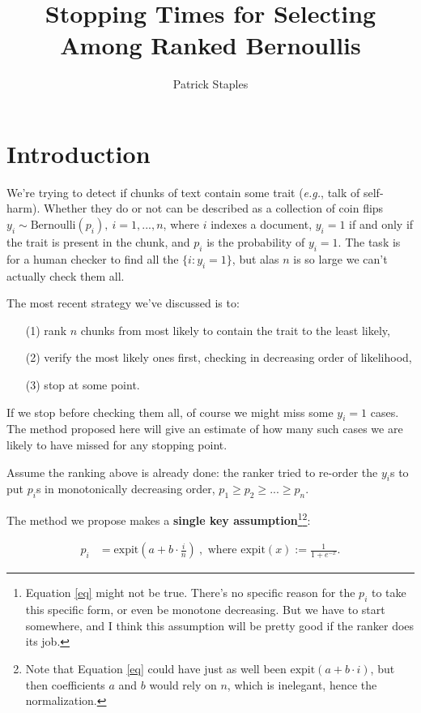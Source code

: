 \documentclass{article}
\title{Stopping Times for Selecting\\Among Ranked Bernoullis}
\date{}
\author{Patrick Staples}
\begin{document}
\maketitle

\section{Introduction}

We're trying to detect if chunks of text contain some trait (\textit{e.g.}, talk of self-harm). Whether they do or not can be described as a collection of coin flips $y_i \sim \text{Bernoulli}(p_i),\ i=1,...,n$, where $i$ indexes a document, $y_i=1$ if and only if the trait is present in the chunk, and $p_i$ is the probability of $y_i=1$. The task is for a human checker to find all the $\{i: y_i=1\}$, but alas $n$ is so large we can't actually check them all.

The most recent strategy we've discussed is to:
\begin{enumerate}
\item[(1)] rank $n$ chunks from most likely to contain the trait to the least likely,
\item[(2)] verify the most likely ones first, checking in decreasing order of likelihood,
\item[(3)] stop at some point.
\end{enumerate}

If we stop before checking them all, of course we might miss some $y_i=1$ cases. The method proposed here will give an estimate of how many such cases we are likely to have missed for any stopping point.

Assume the ranking above is already done: the ranker tried to re-order the $y_i$s to put $p_i$s in monotonically decreasing order, $p_1 \geq p_2 \geq ... \geq p_n$.

The method we propose makes a \textbf{single key assumption}\footnote{Equation \ref{eq} might not be true. There's no specific reason for the $p_i$ to take this specific form, or even be monotone decreasing. But we have to start somewhere, and I think this assumption will be pretty good if the ranker does its job.}\footnote{Note that Equation \ref{eq} could have just as well been $\text{expit}(a+b\cdot i)$, but then coefficients $a$ and $b$ would rely on $n$, which is inelegant, hence the normalization.}:

\begin{align}
p_i &= \boxed{\text{expit}\left(a + b\cdot \frac{i}{n}\right)}\ ,\text{\ \ \ where\ \ \ expit}(x) := \frac{1}{1+e^{-x}}.\label{eq}
\end{align}
\end{document}
